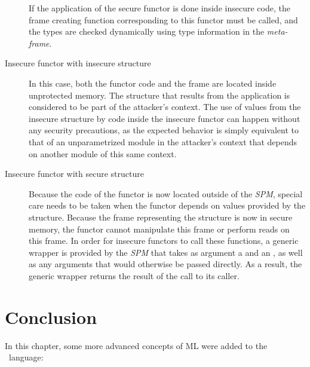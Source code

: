 \begin{description}
If the application of the secure functor is done inside insecure code, the frame creating function corresponding to this functor must be called, and the types are checked dynamically using type information in the \emph{meta-frame}.
\item[Insecure functor with insecure structure]
In this case, both the functor code and the frame are located inside unprotected memory.
The structure that results from the application is considered to be part of the attacker's context.
The use of values from the insecure structure by code inside the insecure functor can happen without any security precautions, as the expected behavior is simply equivalent to that of an unparametrized module in the attacker's context that depends on another module of this same context.
\item[Insecure functor with secure structure]
Because the code of the functor is now located outside of the \emph{SPM}, special care needs to be taken when the functor depends on values provided by the structure.
Because the frame  representing the structure is now in secure memory, the functor cannot manipulate this frame or perform reads on this frame.
In order for insecure functors to call these functions, a generic wrapper is provided by the \emph{SPM} that takes as argument a  and an , as well as any arguments that would otherwise be passed directly.
As a result, the generic wrapper returns the result of the call to its caller.
\end{description}


\section{Conclusion}
In this chapter, some more advanced concepts of ML were added to the \MiniML\ language:

